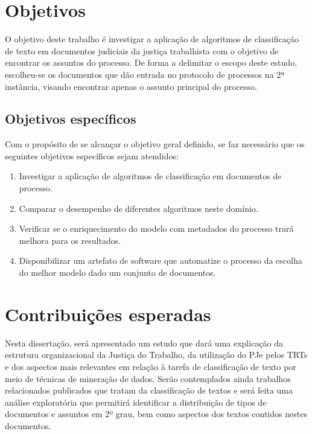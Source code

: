 \section{Objetivos}%
O objetivo deste trabalho é investigar a aplicação de algoritmos de classificação de texto em documentos judiciais da justiça trabalhista  com o objetivo de encontrar os assuntos do processo. De forma a delimitar o escopo deste estudo, escolheu-se os documentos que dão entrada no protocolo de processos na 2ª instância, visando encontrar apenas o assunto principal do processo.

\subsection{Objetivos específicos}%

Com o propósito de se alcançar o objetivo geral definido, se faz necessário que os seguintes objetivos específicos sejam atendidos:
\begin{enumerate}
\item Investigar a aplicação de algoritmos de classificação em documentos de processo.
\item Comparar o desempenho de diferentes algoritmos neste domínio.
\item Verificar se o enriquecimento do modelo com metadados do processo trará melhora para os resultados.
\item Disponibilizar um artefato de software que automatize o processo da escolha do melhor modelo dado um conjunto de documentos.
\end{enumerate}


\section{Contribuições esperadas}
Nesta dissertação, será apresentado um estudo que dará uma explicação da estrutura organizacional da Justiça do Trabalho, da utilização do PJe pelos TRTs e dos aspectos mais relevantes em relação à tarefa de classificação de texto por meio de técnicas de mineração de dados. Serão contemplados ainda trabalhos relacionados publicados que tratam da classificação de textos e será feita uma análise exploratória que permitirá identificar a distribuição de tipos de documentos e assuntos em 2º grau, bem como aspectos dos textos contidos nestes documentos.

